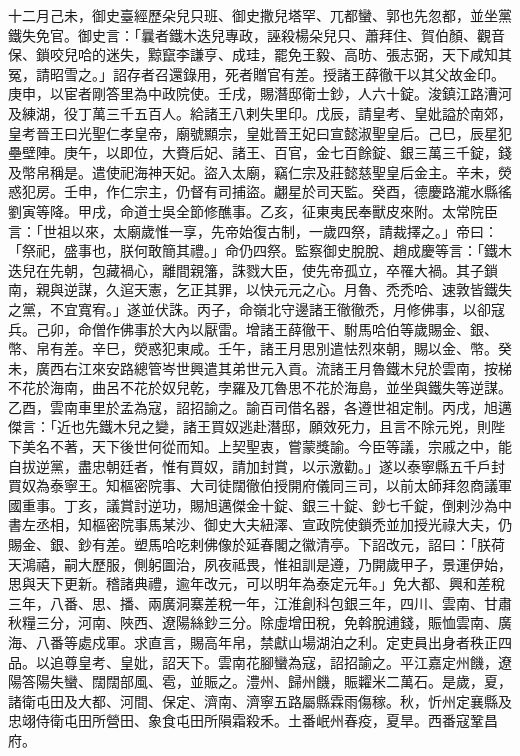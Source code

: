 \begin{pinyinscope}
 十二月己未，御史臺經歷朵兒只班、御史撒兒塔罕、兀都蠻、郭也先忽都，並坐黨鐵失免官。御史言：「曩者鐵木迭兒專政，誣殺楊朵兒只、蕭拜住、賀伯顏、觀音保、鎖咬兒哈的迷失，黥竄李謙亨、成珪，罷免王毅、高昉、張志弼，天下咸知其冤，請昭雪之。」詔存者召還錄用，死者贈官有差。授諸王薛徹干以其父故金印。庚申，以宦者剛答里為中政院使。壬戌，賜潛邸衛士鈔，人六十錠。浚鎮江路漕河及練湖，役丁萬三千五百人。給諸王八剌失里印。戊辰，請皇考、皇妣謚於南郊，皇考晉王曰光聖仁孝皇帝，廟號顯宗，皇妣晉王妃曰宣懿淑聖皇后。己巳，辰星犯壘壁陣。庚午，以即位，大賚后妃、諸王、百官，金七百餘錠、銀三萬三千錠，錢及幣帛稱是。遣使祀海神天妃。盜入太廟，竊仁宗及莊懿慈聖皇后金主。辛未，熒惑犯房。壬申，作仁宗主，仍督有司捕盜。翽星於司天監。癸酉，德慶路瀧水縣徭劉寅等降。甲戌，命道士吳全節修醮事。乙亥，征東夷民奉獸皮來附。太常院臣言：「世祖以來，太廟歲惟一享，先帝始復古制，一歲四祭，請裁擇之。」帝曰：「祭祀，盛事也，朕何敢簡其禮。」命仍四祭。監察御史脫脫、趙成慶等言：「鐵木迭兒在先朝，包藏禍心，離間親籓，誅戮大臣，使先帝孤立，卒罹大禍。其子鎖南，親與逆謀，久逭天憲，乞正其罪，以快元元之心。月魯、禿禿哈、速敦皆鐵失之黨，不宜寬宥。」遂並伏誅。丙子，命嶺北守邊諸王徹徹禿，月修佛事，以卻寇兵。己卯，命僧作佛事於大內以厭雷。增諸王薛徹干、駙馬哈伯等歲賜金、銀、幣、帛有差。辛巳，熒惑犯東咸。壬午，諸王月思別遣怯烈來朝，賜以金、幣。癸未，廣西右江來安路總管岑世興遣其弟世元入貢。流諸王月魯鐵木兒於雲南，按梯不花於海南，曲呂不花於奴兒乾，孛羅及兀魯思不花於海島，並坐與鐵失等逆謀。乙酉，雲南車里於孟為寇，詔招諭之。諭百司借名器，各遵世祖定制。丙戌，旭邁傑言：「近也先鐵木兒之變，諸王買奴逃赴潛邸，願效死力，且言不除元兇，則陛下美名不著，天下後世何從而知。上契聖衷，嘗蒙獎諭。今臣等議，宗戚之中，能自拔逆黨，盡忠朝廷者，惟有買奴，請加封賞，以示激勸。」遂以泰寧縣五千戶封買奴為泰寧王。知樞密院事、大司徒闊徹伯授開府儀同三司，以前太師拜忽商議軍國重事。丁亥，議賞討逆功，賜旭邁傑金十錠、銀三十錠、鈔七千錠，倒剌沙為中書左丞相，知樞密院事馬某沙、御史大夫紐澤、宣政院使鎖禿並加授光祿大夫，仍賜金、銀、鈔有差。塑馬哈吃剌佛像於延春閣之徽清亭。下詔改元，詔曰：「朕荷天鴻禧，嗣大歷服，側躬圖治，夙夜祗畏，惟祖訓是遵，乃開歲甲子，景運伊始，思與天下更新。稽諸典禮，逾年改元，可以明年為泰定元年。」免大都、興和差稅三年，八番、思、播、兩廣洞寨差稅一年，江淮創科包銀三年，四川、雲南、甘肅秋糧三分，河南、陜西、遼陽絲鈔三分。除虛增田稅，免斡脫逋錢，賑恤雲南、廣海、八番等處戍軍。求直言，賜高年帛，禁獻山場湖泊之利。定吏員出身者秩正四品。以追尊皇考、皇妣，詔天下。雲南花腳蠻為寇，詔招諭之。平江嘉定州饑，遼陽答陽失蠻、闊闊部風、雹，並賑之。澧州、歸州饑，賑糶米二萬石。是歲，夏，諸衛屯田及大都、河間、保定、濟南、濟寧五路屬縣霖雨傷稼。秋，忻州定襄縣及忠翊侍衛屯田所營田、象食屯田所隕霜殺禾。土番岷州春疫，夏旱。西番寇鞏昌府。




\end{pinyinscope}
